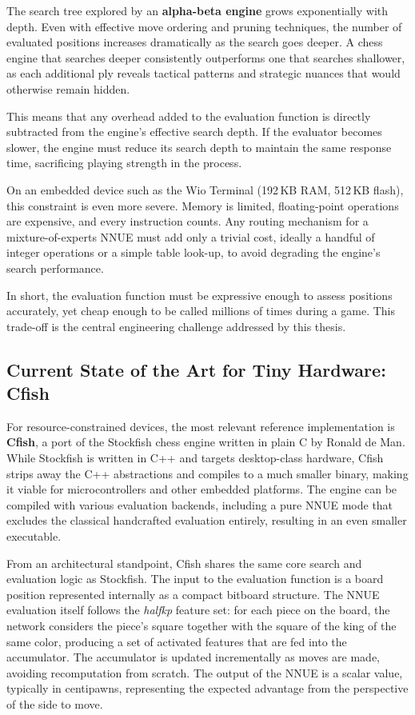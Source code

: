 The search tree explored by an \textbf{alpha-beta engine} grows exponentially with depth. Even with effective move ordering and pruning techniques, the number of evaluated positions increases dramatically as the search goes deeper. A chess engine that searches deeper consistently outperforms one that searches shallower, as each additional ply reveals tactical patterns and strategic nuances that would otherwise remain hidden.

This means that any overhead added to the evaluation function is directly subtracted from the engine's effective search depth. If the evaluator becomes slower, the engine must reduce its search depth to maintain the same response time, sacrificing playing strength in the process.

On an embedded device such as the Wio Terminal (192\,KB RAM, 512\,KB flash), this constraint is even more severe. Memory is limited, floating-point operations are expensive, and every instruction counts. Any routing mechanism for a mixture-of-experts NNUE must add only a trivial cost, ideally a handful of integer operations or a simple table look-up, to avoid degrading the engine's search performance.

In short, the evaluation function must be expressive enough to assess positions accurately, yet cheap enough to be called millions of times during a game. This trade-off is the central engineering challenge addressed by this thesis.

\subsection{Current State of the Art for Tiny Hardware: Cfish}\label{sec:cfish-sota}

For resource-constrained devices, the most relevant reference implementation is \textbf{Cfish}, a port of the Stockfish chess engine written in plain C by Ronald de Man. While Stockfish is written in C++ and targets desktop-class hardware, Cfish strips away the C++ abstractions and compiles to a much smaller binary, making it viable for microcontrollers and other embedded platforms. The engine can be compiled with various evaluation backends, including a pure NNUE mode that excludes the classical handcrafted evaluation entirely, resulting in an even smaller executable.

From an architectural standpoint, Cfish shares the same core search and evaluation logic as Stockfish. The input to the evaluation function is a board position represented internally as a compact bitboard structure. The NNUE evaluation itself follows the \emph{halfkp} feature set: for each piece on the board, the network considers the piece's square together with the square of the king of the same color, producing a set of activated features that are fed into the accumulator. The accumulator is updated incrementally as moves are made, avoiding recomputation from scratch. The output of the NNUE is a scalar value, typically in centipawns, representing the expected advantage from the perspective of the side to move.

